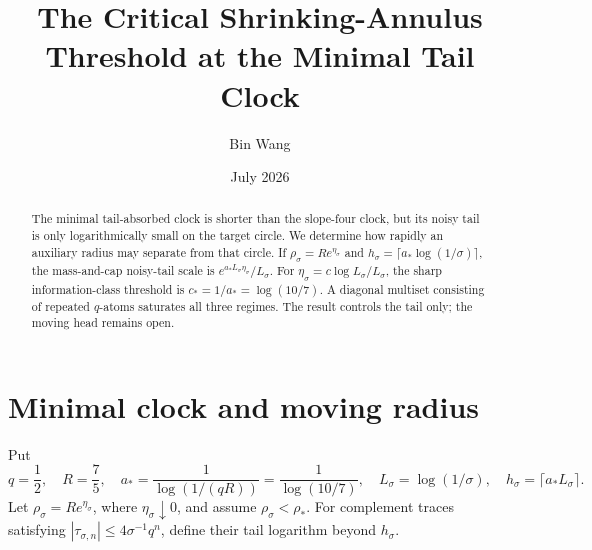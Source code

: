 \documentclass[11pt]{article}
\title{The Critical Shrinking-Annulus Threshold at the Minimal Tail Clock}
\author{Bin Wang}\date{July 2026}
\theoremstyle{remark}\newtheorem{remark}[theorem]{Remark}
\begin{document}
\maketitle
\begin{abstract}
The minimal tail-absorbed clock is shorter than the slope-four clock, but its
noisy tail is only logarithmically small on the target circle.  We determine
how rapidly an auxiliary radius may separate from that circle.  If
$\rho_\sigma=Re^{\eta_\sigma}$ and
$h_\sigma=\lceil a_*\log(1/\sigma)\rceil$, the mass-and-cap noisy-tail scale
is $e^{a_*L_\sigma\eta_\sigma}/L_\sigma$.  For
$\eta_\sigma=c\log L_\sigma/L_\sigma$, the sharp information-class threshold
is $c_*=1/a_*=\log(10/7)$.  A diagonal multiset consisting of repeated
$q$-atoms saturates all three regimes.  The result controls the tail only;
the moving head remains open.
\end{abstract}

\section{Minimal clock and moving radius}
Put
\[
 q=\frac12,\quad R=\frac75,\quad
 a_*=\frac1{\log(1/(qR))}=\frac1{\log(10/7)},\quad
 L_\sigma=\log(1/\sigma),\quad
 h_\sigma=\lceil a_*L_\sigma\rceil.
\]
Let $\rho_\sigma=Re^{\eta_\sigma}$, where $\eta_\sigma\downarrow0$, and
assume $\rho_\sigma<\rho_*$.  For complement traces satisfying
$|\tau_{\sigma,n}|\le4\sigma^{-1}q^n$, define their tail logarithm beyond
$h_\sigma$.
\end{document}
